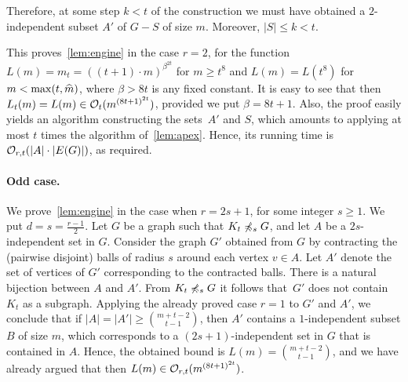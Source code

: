  Therefore, at some step $k<t$ of the construction we must have obtained a $2$-independent subset $A'$ of $G-S$ of size $m$. Moreover, $|S|\le k<t$.
 
 
 
 This proves~\cref{lem:engine} in the case $r=2$, for the function $L(m)=m_t=((t+1)\cdot m)^{\beta^{2t}}$
 for $m\ge t^8$ and $L(m)=L(t^8)$ for $m<\max(t,\widehat{m})$, where $\beta>8t$ is any fixed constant.
 It is easy to see that then $L_t(m)=L(m)\in \mathcal{O}_{t}{(m^{{(8t+1)}^{2t}})}$, provided we put $\beta=8t+1$.
 Also, the proof easily yields an algorithm constructing the sets~$A'$ and $S$,
 which amounts to applying at most $t$ times the algorithm of~\cref{lem:apex}.
 Hence, its running time  is $\mathcal{O}_{r,t}(|A|\cdot |E(G)|)$, as required.


\paragraph{Odd case.}
We prove~\cref{lem:engine} in the case when $r=2s+1$, for some integer $s\geq 1$. We put $d=s=\frac{r-1}{2}$.
Let $G$ be a graph such that $K_t\not\preccurlyeq_s G$, and 
 let $A$ be a $2s$-independent set in $G$. Consider the graph $G'$ obtained from $G$
by contracting the (pairwise disjoint) balls of radius $s$ around each vertex $v\in A$.
 Let $A'$ denote the set of vertices of $G'$ corresponding to the contracted balls. There is a natural bijection between $A$ and $A'$.
From $K_t\not\preccurlyeq_s G$ it follows that~$G'$ does not contain $K_t$ as a subgraph. Applying the already proved case $r=1$ to $G'$ and $A'$, we conclude that 
if $|A|=|A'|\ge {m+t-2\choose t-1}$, then
 $A'$ contains a $1$-independent subset $B$ of size $m$,
 which corresponds to a $(2s+1)$-independent set in $G$ that is contained in $A$.
 Hence, the obtained bound is $L(m)={m+t-2\choose t-1}$, and we have already argued that then $L(m)\in \mathcal{O}_{r,t}{(m^{{(8t+1)}^{2t}})}$.
 
 
